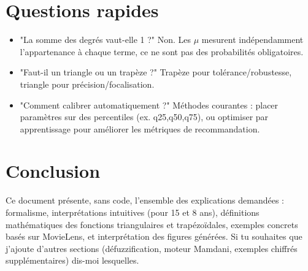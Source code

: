 \documentclass[a4paper,11pt]{article}
\begin{document}
\section{Questions rapides}
\begin{itemize}
  \item "La somme des degrés vaut-elle 1 ?" Non. Les $\mu$ mesurent indépendamment l'appartenance à chaque terme, ce ne sont pas des probabilités obligatoires.
  \item "Faut-il un triangle ou un trapèze ?"  Trapèze pour tolérance/robustesse, triangle pour précision/focalisation.
  \item "Comment calibrer automatiquement ?" Méthodes courantes : placer paramètres sur des percentiles (ex. q25,q50,q75), ou optimiser par apprentissage pour améliorer les métriques de recommandation.
\end{itemize}

\section*{Conclusion}
Ce document présente, sans code, l'ensemble des explications demandées : formalisme, interprétations intuitives (pour 15 et 8 ans), définitions mathématiques des fonctions triangulaires et trapézoïdales, exemples concrets basés sur MovieLens, et interprétation des figures générées. Si tu souhaites que j'ajoute d'autres sections (défuzzification, moteur Mamdani, exemples chiffrés supplémentaires) dis-moi lesquelles.
\end{document}
